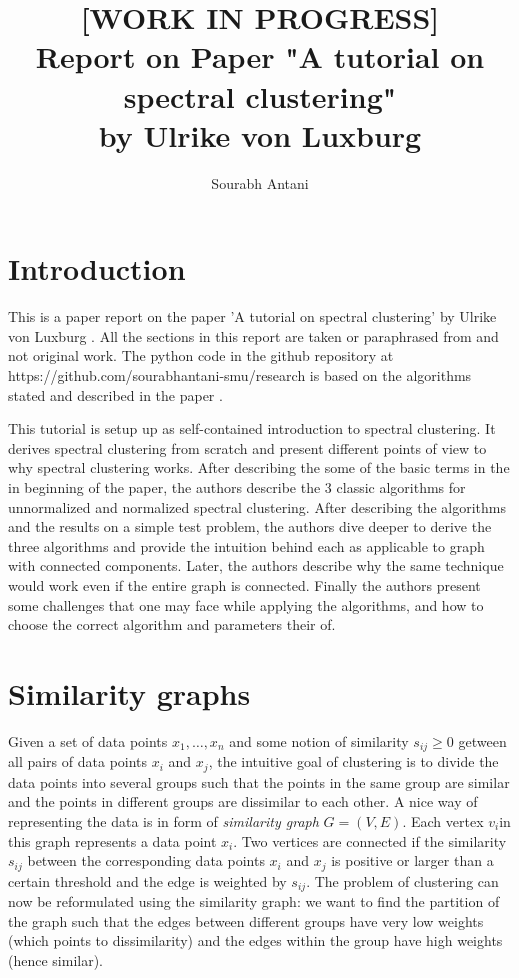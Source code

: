 \documentclass[10pt,a4paper, nocenter]{report}
\author{Sourabh Antani}
\title{[WORK IN PROGRESS] \\ Report on Paper "A tutorial on spectral clustering" \\by Ulrike von Luxburg}
\date{}
\begin{document}
	\maketitle

	
	\chapter{Introduction}
	\thispagestyle{fancy}
	This is a paper report on the paper 'A tutorial on spectral clustering' by Ulrike von Luxburg \cite{Luxburg2007}. All the sections in this report are taken or paraphrased from \cite{Luxburg2007} and not original work. The python code in the github repository at https://github.com/sourabhantani-smu/research is based on the algorithms stated and described in the paper \cite{Luxburg2007}.
	
	This tutorial is setup up as self-contained introduction to spectral clustering. It derives spectral clustering from scratch and present different points of view to why spectral clustering works. After describing the some of the basic terms in the in beginning of the paper, the authors describe the 3 classic algorithms for unnormalized and normalized spectral clustering. After describing the algorithms and the results on a simple test problem, the authors dive deeper to derive the three algorithms and provide the intuition behind each as applicable to graph with connected components. Later, the authors describe why the same technique would work even if the entire graph is connected. Finally the authors present some challenges that one may face while applying the algorithms, and how to choose the correct algorithm and parameters their of.
	
	\chapter{Similarity graphs}
	\thispagestyle{fancy}
		Given a set of data points $x_{1},\dots,x_{n}$ and some notion of similarity $s_{ij}\ge 0$ getween all pairs of data points $x_{i}$ and $x_{j}$, the intuitive goal of clustering is to divide the data points into several groups such that the points in the same group are similar and the points in different groups are dissimilar to each other. A nice way of representing the data is in form of \textit{similarity graph} $G=(V,E)$. Each vertex $v_{i}$in this graph represents a data point $x_{i}$. Two vertices are connected if the similarity $s_{ij}$ between the corresponding data points $x_{i}$ and $x_{j}$ is positive or larger than a certain threshold and the edge is weighted by $s_{ij}$. The problem of clustering can now be reformulated using the similarity graph: we want to find the partition of the graph such that the edges between different groups have very low weights (which points to dissimilarity) and the edges within the group have high weights (hence similar). 
		\\
\end{document}
